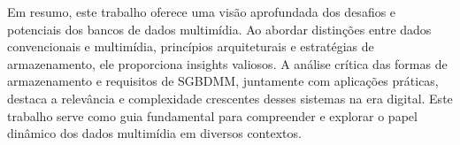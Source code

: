 \documentclass[12pt]{article}
\begin{document}
	Em resumo, este trabalho oferece uma visão aprofundada dos desafios e potenciais dos bancos de dados multimídia. Ao abordar distinções entre dados convencionais e multimídia, princípios arquiteturais e estratégias de armazenamento, ele proporciona insights valiosos. A análise crítica das formas de armazenamento e requisitos de SGBDMM, juntamente com aplicações práticas, destaca a relevância e complexidade crescentes desses sistemas na era digital. Este trabalho serve como guia fundamental para compreender e explorar o papel dinâmico dos dados multimídia em diversos contextos.\vspace{1em}
	
	
	
	
\end{document}
